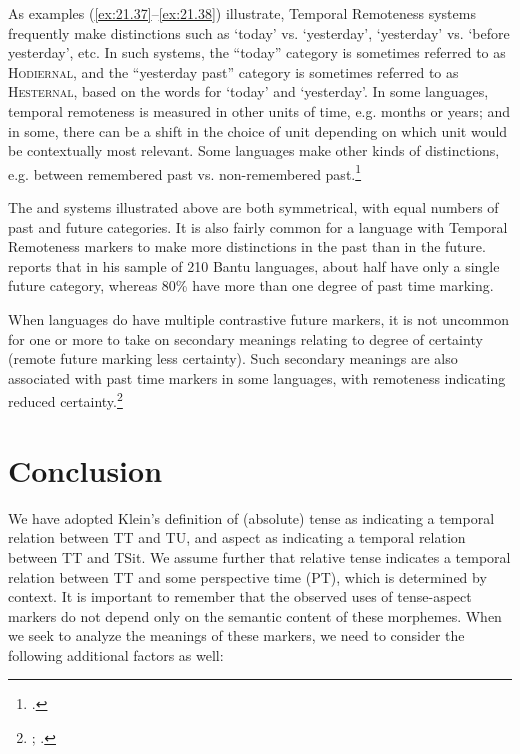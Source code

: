 As examples (\ref{ex:21.37}--\ref{ex:21.38}) illustrate, Temporal Remoteness systems frequently make distinctions such as ‘today’ vs. ‘yesterday’, ‘yesterday’ vs. ‘before yesterday’, etc. In such systems, the “today” category is sometimes referred to as \textsc{Hodiernal}, and the “yesterday past” category is sometimes referred to as \textsc{Hesternal}, based on the  words for ‘today’ and ‘yesterday’. In some languages, temporal remoteness is measured in other units of time, e.g. months or years; and in some, there can be a shift in the choice of unit depending on which unit would be contextually most relevant. Some languages make other kinds of distinctions, e.g. between remembered past vs. non-remembered past.\footnote{\citet{Botne2012}.}



The  and  systems illustrated above are both symmetrical, with equal numbers of past and future categories. It is also fairly common for a language with Temporal Remoteness markers to make more distinctions in the past than in the future. \citet{Nurse2008} reports that in his sample of 210 {Bantu} languages, about half have only a single future category, whereas 80\% have more than one degree of past time marking. 



When languages do have multiple contrastive future markers, it is not uncommon for one or more to take on secondary meanings relating to degree of certainty (remote future marking less certainty). Such secondary meanings are also associated with past time markers in some languages, with remoteness indicating reduced certainty.\footnote{\citet{Botne2012}; \citet{Nurse2008}.}


\section{Conclusion}\label{sec:21.6}

We have adopted Klein’s definition of (absolute) tense as indicating a temporal relation between TT and TU, and aspect as indicating a temporal relation between TT and TSit. We assume further that relative tense indicates a temporal relation between TT and some perspective time (PT), which is determined by context. It is important to remember that the observed uses of tense-aspect markers do not depend only on the semantic content of these morphemes. When we seek to analyze the meanings of these markers, we need to consider the following additional factors as well:


